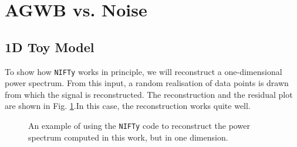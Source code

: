 \section{AGWB vs. Noise}


\subsection{1D Toy Model}

To show how {\tt NIFTy} works in principle, we will reconstruct a one-dimensional power spectrum. From this input, a random realisation of data points is drawn from which the signal is reconstructed. The reconstruction and the residual plot are shown in Fig. \ref{1D_reconstruction}.In this case, the reconstruction works quite well. 

\begin{figure}[h]
    \centering
    \caption{An example of using the {\tt NIFTy} code to reconstruct the power spectrum computed in this work, but in one dimension.}
    \label{1D_reconstruction}
\end{figure}

